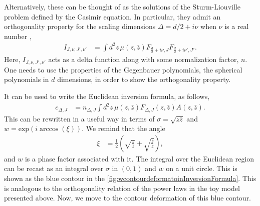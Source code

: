 Alternatively, these can be thought of as the solutions of the Sturm-Liouville problem defined by the Casimir equation.
In particular, they admit an orthogonality property for the scaling dimensions $ \Delta = d/2 + i \nu $ when $ \nu $ is a real number \cite{Caron-Huot:2017vep},
\begin{align}
  I_{J,\nu, J',\nu'} & =
  \int d^2z \, \mu\left( z,\bar{z} \right) F_{\frac{d}{2}  + i \nu,J}  F_{\frac{d}{2}  + i \nu',J'}
  .\end{align}
Here, $ I_{J,\nu, J',\nu'} $ acts as a delta function along with some normalization factor, $ n $.
One needs to use the properties of the Gegenbauer polynomials, the spherical polynomials in $ d $ dimensions, in order to show the orthogonality property.

It can be used to write the Euclidean inversion formula, as follows,
\begin{align}
  \label{eq:EuclideanInversionIntro}
  c_{\Delta,J} & = n_{\Delta,J} \int d^2z \, \mu\left( z,\bar{z} \right) F_{\Delta,J} \left( z,\bar{z} \right) A\left( z,\bar{z} \right)
  .\end{align}
This can be rewritten in a useful way in terms of $ \sigma  = \sqrt{z \bar{z}}$ and $ w = \text{exp} \left( i \arccos \left( \xi \right)  \right) $.
We remind that the angle
\begin{align}
  \xi & =	\frac{1}{2} \left(
  \sqrt{\frac{z}{\bar{z}}} + \sqrt{\frac{\bar{z}}{z}}
  \right)
  ,\end{align}
and $ w $ is a phase factor associated with it.
The integral over the Euclidean region can be recast as an integral over $ \sigma $ in $ \left( 0,1 \right) $ and $ w $ on a unit circle.
This is shown as the blue contour in the \cref{fig:wcontourdeformatoinInversionFormula}.
This is analogous to the orthogonality relation of the power laws in the toy model presented above.
Now, we move to the contour deformation of this blue contour.

